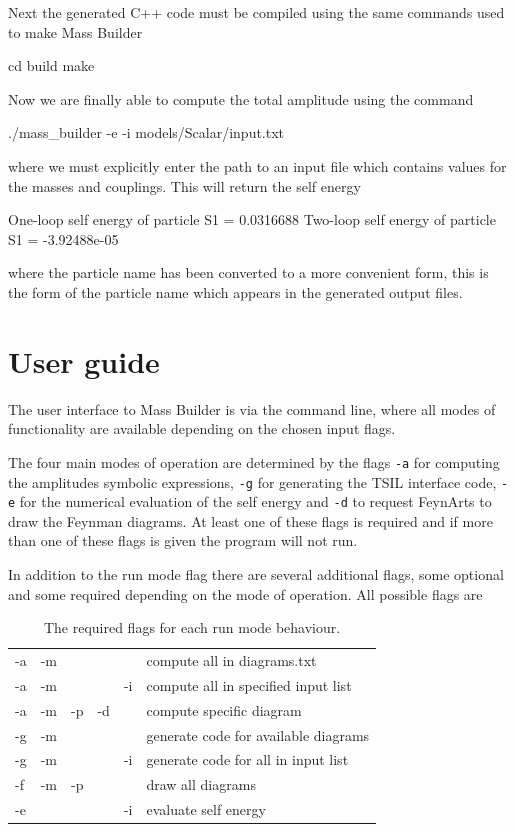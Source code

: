 Next the generated C++ code must be compiled using the same commands used to make Mass Builder
\begin{lstterm}
cd build
make
\end{lstterm}
Now we are finally able to compute the total amplitude using the command
\begin{lstterm}
./mass_builder -e -i models/Scalar/input.txt
\end{lstterm}
where we must explicitly enter the path to an input file which contains values for the masses and couplings.  This will return the self energy
\begin{lstterm}
One-loop self energy of particle S1 = 0.0316688
Two-loop self energy of particle S1 = -3.92488e-05
\end{lstterm}
where the particle name has been converted to a more convenient form, this is the form of the particle name which appears in the generated output files.

\section{User guide}\label{sec:user_guide}

The user interface to Mass Builder is via the command line, where all modes of functionality are available depending on the chosen input flags.

The four main modes of operation are determined by the flags \lstinline{-a} for computing the amplitudes symbolic expressions, \lstinline{-g} for generating the TSIL interface code, \lstinline{-e} for the numerical evaluation of the self energy and \lstinline{-d} to request FeynArts to draw the Feynman diagrams.  At least one of these flags is required and if more than one of these flags is given the program will not run.

In addition to the run mode flag there are several additional flags, some optional and some required depending on the mode of operation.  All possible flags are
\begin{table}
\caption{The required flags for each run mode behaviour.}
\begin{tabular}{l c c c c l} 
\hline
-a & -m & & & &compute all in diagrams.txt \\
-a & -m &  && -i&compute all in specified input list\\
-a & -m & -p & -d && compute specific diagram\\
-g & -m & & &  &generate code for available diagrams\\
-g & -m &  & & -i &generate code for all in input list\\
-f & -m & -p & & &draw all diagrams\\
-e &  & & & -i&evaluate self energy\\
\hline\end{tabular}
\end{table}


